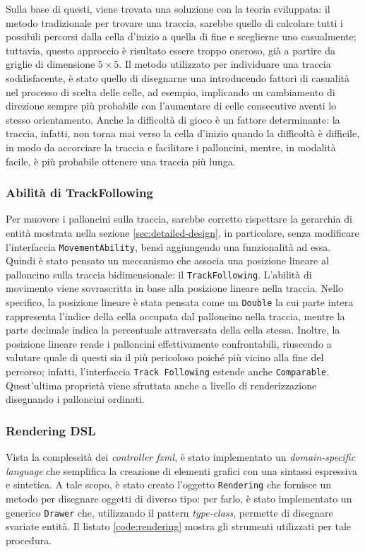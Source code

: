 Sulla base di questi, viene trovata una soluzione con la teoria sviluppata: il metodo tradizionale per trovare una
traccia, sarebbe quello di calcolare tutti i possibili percorsi dalla cella d'inizio a quella di fine e sceglierne uno
casualmente; tuttavia, questo approccio è risultato essere troppo oneroso, già a partire da griglie di dimensione
$5 \times 5$. Il metodo utilizzato per individuare una traccia soddisfacente, è stato quello di disegnarne una
introducendo fattori di casualità nel processo di scelta delle celle, ad esempio, implicando un cambiamento di direzione
sempre più probabile con l'aumentare di celle consecutive aventi lo stesso orientamento. Anche la difficoltà di gioco
è un fattore determinante: la traccia, infatti, non torna mai verso la cella d'inizio quando la difficoltà è difficile,
in modo da accorciare la traccia e facilitare i palloncini, mentre, in modalità facile, è più probabile ottenere una
traccia più lunga.

\subsubsection{Abilità di TrackFollowing}
Per muovere i palloncini sulla traccia, sarebbe corretto rispettare la gerarchia di entità mostrata nella sezione
\ref{sec:detailed-design}, in particolare, senza modificare l'interfaccia \texttt{MovementAbility}, bensì aggiungendo una
funzionalità ad essa. Quindi è stato pensato un meccanismo che associa una posizione lineare al palloncino sulla
traccia bidimensionale: il \texttt{TrackFollowing}. L'abilità di movimento viene sovrascritta in base alla posizione
lineare nella traccia. Nello specifico, la posizione lineare è stata pensata come un \texttt{Double} la cui parte
intera rappresenta l'indice della cella occupata dal palloncino nella traccia, mentre la parte decimale indica la
percentuale attraversata della cella stessa. Inoltre, la posizione lineare rende i palloncini effettivamente confrontabili,
riuscendo a valutare quale di questi sia il più pericoloso poiché più vicino alla fine del percorso;
infatti, l'interfaccia \texttt{Track Following} estende anche \texttt{Comparable}. Quest'ultima proprietà viene sfruttata
anche a livello di renderizzazione disegnando i palloncini ordinati.

\subsubsection{Rendering DSL}
Vista la complessità dei \textit{controller fxml}, è stato implementato un \textit{domain-specific language} che
semplifica la creazione di elementi grafici con una sintassi espressiva e sintetica. A tale scopo, è stato creato
l'oggetto \texttt{Rendering} che fornisce un metodo per disegnare oggetti di diverso tipo: per farlo, è stato
implementato un generico \texttt{Drawer} che, utilizzando il pattern \textit{type-class}, permette di
disegnare svariate entità. Il listato \ref{code:rendering} mostra gli strumenti utilizzati per tale procedura.

